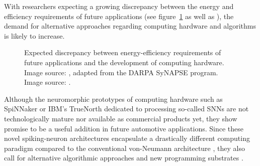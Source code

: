 With researchers expecting a growing discrepancy between the energy and efficiency requirements of future applications (see figure~\ref{fig:energy_efficiency_issues} as well as \textcite{Marr2013, Farahini2016, Akopyan2015}), the demand for alternative approaches regarding computing hardware and algorithms is likely to increase.
\begin{figure}[h!]
    \centering
    \caption{Expected discrepancy between energy-efficiency requirements of future applications and the development of computing hardware.~\protect{} Image source: \textcite{Farahini2016}, adapted from the \acs{DARPA} \acs{SyNAPSE} program.~\protect{} Image source: \textcite{Marr2013}.}
    \label{fig:energy_efficiency_issues}
\end{figure}
Although the neuromorphic prototypes of computing hardware such as \ac{SpiNNaker} \parencite{Furber2014} or  IBM's TrueNorth \parencite{Akopyan2015} dedicated to processing so-called \acp{SNN} are not technologically mature nor available as commercial products yet, they show promise to be a useful addition in future automotive applications.
Since these novel spiking-neuron architectures encapsulate a drastically different computing paradigm compared to the conventional von-Neumann architecture \parencite{vonNeumann1993}, they also call for alternative algorithmic approaches and new programming substrates \parencite{Amir2013}.

